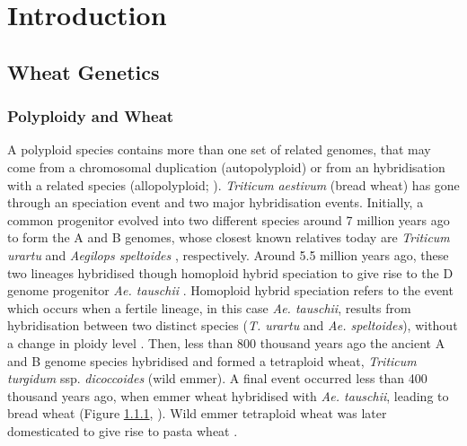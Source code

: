 

\chapter{Introduction}



\section{Wheat Genetics}


\subsection{Polyploidy and Wheat}
\label{lit:polyploidy}

A polyploid species contains more than one set of related genomes, that may come from a chromosomal duplication (autopolyploid) or from an hybridisation with a related species (allopolyploid; \citealt{Shewry2009}). 
\textit{Triticum} \textit{aestivum} (bread wheat) has gone through an speciation event and two major hybridisation events. 
Initially, a common progenitor evolved into two different species around 7 million years ago to form the A and B genomes, whose closest known relatives today are \textit{Triticum urartu} and \textit{Aegilops speltoides} \citep{Dubcovsky2007}, respectively. 
Around 5.5 million years ago, these two lineages hybridised though homoploid hybrid speciation to give rise to the D genome progenitor \textit{Ae. tauschii} \citep{Marcussen2014,ElBaidouri2016}. Homoploid hybrid speciation refers to the event which occurs when a fertile lineage, in this case \textit{Ae. tauschii}, results from hybridisation between two distinct species (\textit{T. urartu} and \textit{Ae. speltoides}), without a change in ploidy level \citep{Gross2012}.
Then, less than 800 thousand years ago the ancient A and B genome species hybridised and formed a tetraploid wheat, \textit{Triticum turgidum} ssp. \textit{dicoccoides} (wild emmer). 
A final event occurred less than 400 thousand years ago, when emmer wheat hybridised with \textit{Ae. tauschii}, leading to bread wheat (Figure \ref{lit:polyploidy}, \citealt{Marcussen2014}). Wild emmer tetraploid wheat was later domesticated to give rise to pasta wheat \citep{Dubcovsky2007}.  



